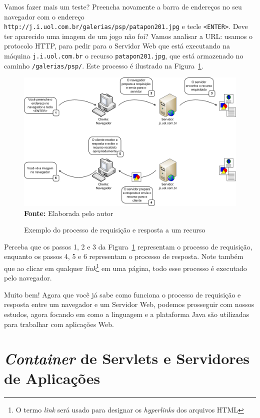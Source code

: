 Vamos fazer mais um teste? Preencha novamente a barra de endereços no seu navegador com o endereço \texttt{http://j.i.uol.com.br/galerias/psp/patapon201.jpg} e tecle \texttt{<ENTER>}. Deve ter aparecido uma imagem de um jogo não foi? Vamos analisar a URL: usamos o protocolo HTTP, para pedir para o Servidor Web que está executando na máquina \texttt{j.i.uol.com.br} o recurso \texttt{patapon201.jpg}, que está armazenado no caminho \texttt{/galerias/psp/}. Este processo é ilustrado na Figura~\ref{fig:cap01ExemploRequestResponse}.

\FloatBarrier
\begin{figure}[!htbp]
    \centering
    \caption{Exemplo do processo de requisição e resposta a um recurso}
    \includegraphics[scale=0.38]{imagens/cap01ExemploRequestResponse}
    \\\textbf{Fonte:} Elaborada pelo autor
    \label{fig:cap01ExemploRequestResponse}
\end{figure}
\FloatBarrier

Perceba que os passos 1, 2 e 3 da Figura~\ref{fig:cap01ExemploRequestResponse} representam o processo de requisição, enquanto os passos 4, 5 e 6 representam o processo de resposta. Note também que ao clicar em qualquer \textit{link}\footnote{O termo \textit{link} será usado para designar os \textit{hyperlinks} dos arquivos HTML} em uma página, todo esse processo é executado pelo navegador.

Muito bem! Agora que você já sabe como funciona o processo de requisição e resposta entre um navegador e um Servidor Web, podemos prosseguir com nossos estudos, agora focando em como a linguagem e a plataforma Java são utilizadas para trabalhar com aplicações Web.


\section{\textit{Container} de Servlets e Servidores de Aplicações}

